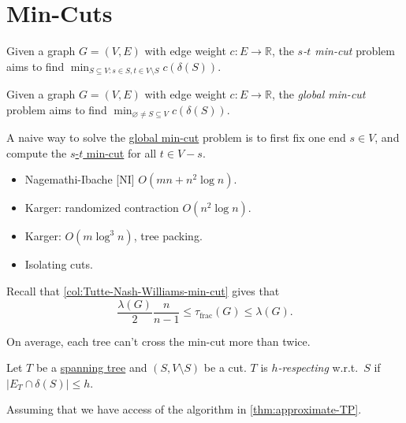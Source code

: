 \section{Min-Cuts}
\begin{problem}\label{prb:s-t-min-cut}
Given a graph \(G = (V, E)\) with edge weight \(c \colon E \to \mathbb{R} \), the \emph{\(s\)-\(t\) min-cut} problem aims to find \(\min _{S \subseteq V \colon s \in S, t \in V\setminus S} c(\delta (S))\).
\end{problem}

\begin{problem}\label{prb:global-min-cut}
Given a graph \(G = (V, E)\) with edge weight \(c \colon E \to \mathbb{R} \), the \emph{global min-cut} problem aims to find \(\min _{\varnothing \neq S \subseteq V} c(\delta (S))\).
\end{problem}

A naive way to solve the \hyperref[prb:global-min-cut]{global min-cut} problem is to first fix one end \(s \in V\), and compute the \hyperref[prb:s-t-min-cut]{\(s\)-\(t\) min-cut} for all \(t \in V - s\).

\begin{itemize}
	\item Nagemathi-Ibache [NI] \(O(mn + n^2 \log n)\).
	\item Karger: randomized contraction \(O(n^2 \log n)\).
	\item Karger: \(O(m \log ^3 n)\), tree packing.
	\item Isolating cuts.
\end{itemize}

Recall that \autoref{col:Tutte-Nash-Williams-min-cut} gives that
\[
	\frac{\lambda (G)}{2} \frac{n}{n-1}
	\leq \tau _{\text{frac} }(G)
	\leq \lambda (G).
\]
\begin{intuition}
	On average, each tree can't cross the min-cut more than twice.
\end{intuition}

\begin{definition}[Respecting]\label{def:respecting}
	Let \(T\) be a \hyperref[def:spanning-tree]{spanning tree} and \((S, V\setminus S)\) be a cut. \(T\)  is \emph{\(h\)-respecting} w.r.t.\ \(S\) if \(\lvert E_T \cap \delta (S) \rvert \leq h\).
\end{definition}

Assuming that we have access of the algorithm in \autoref{thm:approximate-TP}.

